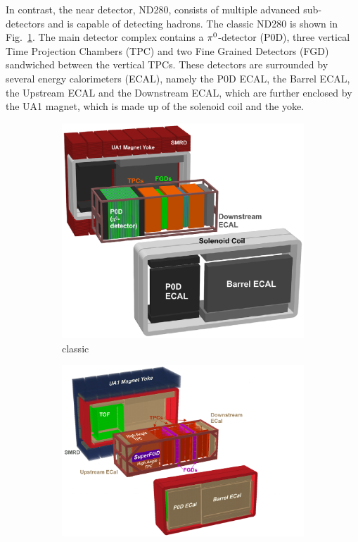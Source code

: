   In contrast, the near detector, ND280, consists of multiple advanced sub-detectors and is capable of detecting hadrons.
  The classic ND280 is shown in Fig.~\ref{subfig:nd280-classic}.
  The main detector complex contains a $\pi^0$-detector (P0D), three vertical Time Projection Chambers (TPC) and two Fine Grained Detectors (FGD) sandwiched between the vertical TPCs.
  These detectors are surrounded by several energy calorimeters (ECAL), namely the P0D ECAL, the Barrel ECAL, the Upstream ECAL and the Downstream ECAL, which are further enclosed by the UA1 magnet, which is made up of the solenoid coil and the yoke. 
  \begin{figure}
        \centering
        \begin{subfigure}[b]{\dbfigwid\textwidth}
            \centering
            \includegraphics[width=\textwidth]{figures/t2k/ND280-classic.eps}
            \caption{classic}
            \label{subfig:nd280-classic}
        \end{subfigure}
        \begin{subfigure}[b]{\dbfigwid\textwidth}
            \centering
            \includegraphics[width=\textwidth]{figures/t2k/ND280-up.png}

\end{subfigure}
\end{figure}
